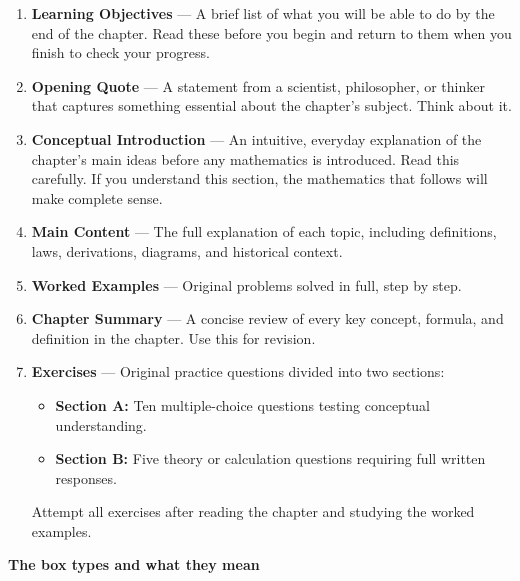 \begin{enumerate}
  \item \textbf{Learning Objectives} --- A brief list of
  what you will be able to do by the end of the chapter.
  Read these before you begin and return to them when you
  finish to check your progress.

  \item \textbf{Opening Quote} --- A statement from a
  scientist, philosopher, or thinker that captures
  something essential about the chapter's subject.
  Think about it.

  \item \textbf{Conceptual Introduction} --- An intuitive,
  everyday explanation of the chapter's main ideas before
  any mathematics is introduced. Read this carefully.
  If you understand this section, the mathematics that
  follows will make complete sense.

  \item \textbf{Main Content} --- The full explanation of
  each topic, including definitions, laws, derivations,
  diagrams, and historical context.

  \item \textbf{Worked Examples} --- Original problems
  solved in full, step by step. 

  \item \textbf{Chapter Summary} --- A concise review of
  every key concept, formula, and definition in the chapter.
  Use this for revision.

  \item \textbf{Exercises} --- Original practice questions
  divided into two sections:
  \begin{itemize}
    \item \textbf{Section A:} Ten multiple-choice questions
    testing conceptual understanding.
    \item \textbf{Section B:} Five theory or calculation
    questions requiring full written responses.
  \end{itemize}
  Attempt all exercises after reading the chapter and
  studying the worked examples.
\end{enumerate}

\vspace{0.5cm}
\textbf{The box types and what they mean}
\vspace{0.3cm}

